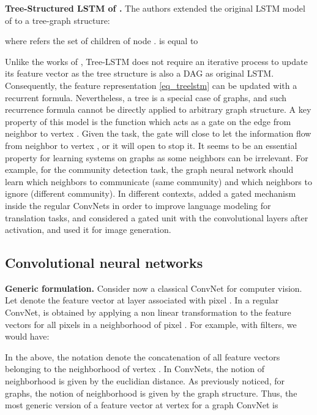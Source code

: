 \documentclass{article} \usepackage{iclr2018_conference,times}
\begin{document}
{\bf Tree-Structured LSTM of \cite{art:TaiSocherManning15TreeLSTM}.} The authors extended the original LSTM model of \cite{art:HochreiterSchmidhuber97LSTM} to a tree-graph structure:

where   refers the set of children of node .  is equal to


Unlike the works of \cite{art:ScarselliGoriTsoiHagenbuchnerMonfardini09,art:LiTarlowBrockschmidtZemel16GNN}, Tree-LSTM does not require an iterative process to update its feature vector  as the tree structure is also a DAG as original LSTM. Consequently, the feature representation \eqref{eq_treelstm} can be updated with a recurrent formula. Nevertheless, a tree is a special case of graphs, and such recurrence formula cannot be directly applied to arbitrary graph structure. A key property of this model is the function  which acts as a gate on the edge from neighbor  to vertex . Given the task, the gate will close to let the information flow from neighbor  to vertex , or it will open to stop it. It seems to be an essential property for learning systems on graphs as some neighbors can be irrelevant. For example, for the community detection task, the graph neural network should learn which neighbors to communicate (same community) and which neighbors to ignore (different community). In different contexts, \cite{art:DauphinFanAuliGrangier17gatedCNN} added a gated mechanism inside the regular ConvNets in order to improve language modeling for translation tasks, and \cite{van2016conditional} considered a gated unit with the convolutional layers after activation, and used it for image generation.








\subsection{Convolutional neural networks}


{\bf Generic formulation.} Consider now a classical ConvNet for computer vision. Let   denote the feature vector at layer  associated with pixel . In a regular ConvNet,  is obtained by applying a non linear transformation to the feature vectors  for all pixels  in a neighborhood of pixel . For example, with  filters, we would have:

In the above, the notation   denote the concatenation of all feature vectors  belonging to the  neighborhood of vertex . In ConvNets, the notion of neighborhood is given by the euclidian distance. As previously noticed, for graphs, the notion of neighborhood is given by the graph structure. Thus, the most generic version of a feature vector  at vertex  for a graph ConvNet is
\end{document}

